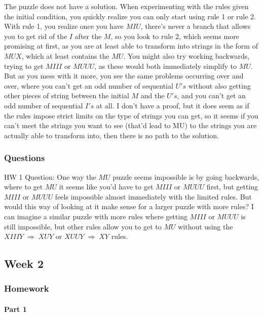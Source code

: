 \documentclass{article}
\theoremstyle{plain}
\theoremstyle{definition}
\theoremstyle{remark}
\begin{document}
The puzzle does not have a solution.  When experimenting with the rules given the initial condition, you
quickly realize you can only start using rule 1 or rule 2.  With rule 1, you realize once you have $MIU$, there's 
never a branch that allows you to get rid of the $I$ after the $M$, so you look to rule 2, which seems more promising
at first, as you are at least able to transform into strings in the form of $MUX$, which at least contains the $MU$. You might
also try working backwards, trying to get $MIII$ or $MUUU$, as these would both immediately simplify to $MU$. But as
you mess with it more, you see the same problems occurring over and over, where you can't get an odd number of sequential $U's$ without also getting other pieces of string 
between the initial $M$ and the $U's$, and you can't get an odd number of sequential $I's$ at all.  I don't have a proof, but it does seem
as if the rules impose strict limits on the type of strings you can get, so it seems if you can't meet the strings you want to see (that'd lead to MU)
to the strings you are actually able to transform into, then there is no path to the solution.

\subsubsection{Questions}

HW 1 Question: One way the $MU$ puzzle seems impossible is by going backwards, where to get $MU$ it seems like 
you'd have to get $MIII$ or $MUUU$ first, but getting $MIII$ or $MUUU$ feels impossible almost immediately with
the limited rules.  But would this way of looking at it make sense for a larger puzzle with more rules? 
I can imagine a similar puzzle with more rules where getting $MIII$ or $MUUU$ is still 
impossible, but other rules allow you to get to $MU$ without using the $XIIIY \;\Rightarrow\; XUY$ or $XUUY \;\Rightarrow\; XY$ rules.

\subsection{Week 2}

\subsubsection{Homework}

\paragraph{Part 1}
\end{document}

